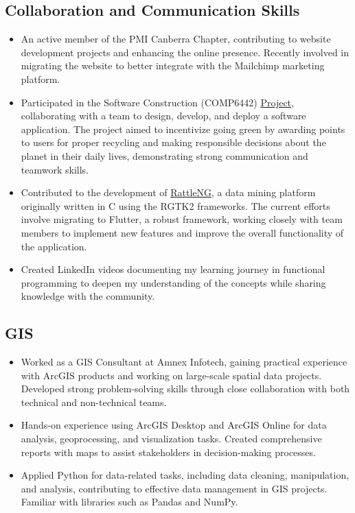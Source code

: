 \documentclass{article}
\begin{document}
\subsection*{Collaboration and Communication Skills}
\begin{itemize}
    \item An active member of the PMI Canberra Chapter, contributing to website development projects and enhancing the online presence. Recently involved in migrating the website to better integrate with the Mailchimp marketing platform.
    \item Participated in the Software Construction (COMP6442) \href{https://gitlab.cecs.anu.edu.au/u7544253/ga-23s1-comp2100-6442} {Project}, collaborating with a team to design, develop, and deploy a software application. The project aimed to incentivize going green by awarding points to users for proper recycling and making responsible decisions about the planet in their daily lives, demonstrating strong communication and teamwork skills.
    \item Contributed to the development of \href{https://github.com/gjwgit/rattleng}{RattleNG}, a data mining platform originally written in C using the RGTK2 frameworks. The current efforts involve migrating to Flutter, a robust framework, working closely with team members to implement new features and improve the overall functionality of the application.
    \item Created LinkedIn videos documenting my learning journey in functional programming to deepen my understanding of the concepts while sharing knowledge with the community.
\end{itemize}

\subsection*{GIS}
\begin{itemize}
    \item Worked as a GIS Consultant at Amnex Infotech, gaining practical experience with ArcGIS products and working on large-scale spatial data projects. Developed strong problem-solving skills through close collaboration with both technical and non-technical teams.
    \item Hands-on experience using ArcGIS Desktop and ArcGIS Online for data analysis, geoprocessing, and visualization tasks. Created comprehensive reports with maps to assist stakeholders in decision-making processes.
    \item Applied Python for data-related tasks, including data cleaning, manipulation, and analysis, contributing to effective data management in GIS projects. Familiar with libraries such as Pandas and NumPy.
\end{itemize}
\end{document}
